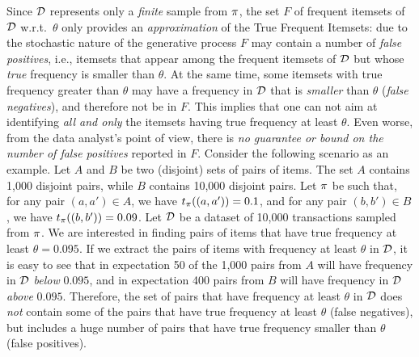 Since ${\cal D}$ represents only a \emph{finite} sample from $\pi$, the set $F$ of frequent itemsets
of ${\cal D}$ w.r.t.~$\theta$ %
only provides an \emph{approximation} of the True Frequent Itemsets: %
due to the stochastic nature of the generative process %
$F$ %
may contain a number of \emph{false positives}, %
 i.e., itemsets that appear among the frequent itemsets of
 ${\cal D}$ but whose \emph{true} frequency is smaller than %
$\theta$. %
At the same time, some itemsets with true frequency
greater than $\theta$ may have a frequency in ${\cal D}$ that is \emph{smaller} than
$\theta$ (\emph{false negatives}), and therefore not be in $F$. This implies
that %
one can not aim at identifying \emph{all and only} the itemsets having true frequency %
at least $\theta$.
Even worse, from the data analyst's point of view, %
there is \emph{no guarantee or bound on the number of false positives} reported
in $F$. %
Consider the following scenario as an example. Let $A$ and $B$ be two (disjoint)
sets of pairs of items. The set $A$ contains 1,000 disjoint pairs, while $B$
contains 10,000 disjoint pairs. Let $\pi$ be such that, for any pair $(a,a')\in
A$, we have $t_\pi((a,a'))=0.1$, and for any pair $(b,b')\in B$, we have
$t_\pi((b,b'))=0.09$. Let ${\cal D}$ be a dataset of 10,000 transactions sampled from
$\pi$. %
We are interested in finding pairs of items that have true frequency at least %
$\theta=0.095$. %
If we extract the pairs of items with frequency at least $\theta$ in ${\cal D}$,
it is easy to see that in expectation %
50 of the 1,000 pairs from $A$ will have frequency in ${\cal D}$ %
\emph{below} $0.095$, and in expectation %
400 pairs from $B$ will have frequency in ${\cal D}$ %
\emph{above} $0.095$.
Therefore, the set of pairs that have frequency at least $\theta$ in ${\cal D}$ does
\emph{not} contain %
some of the pairs that have true frequency %
at least $\theta$ %
(false negatives), but %
includes a huge number of %
pairs that have true frequency smaller than $\theta$ (false positives). %

